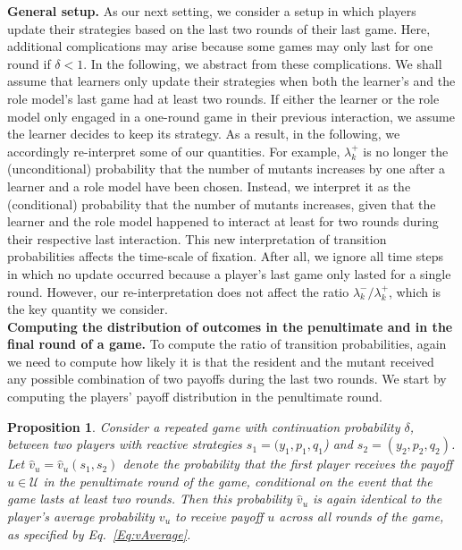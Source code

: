 \documentclass[11pt]{article}
\def\strategy{s}
\theoremstyle{plainCl1}
\newtheorem{Prop}{Proposition}
\theoremstyle{plainCl2}
\begin{document}

{\bf General setup.} As our next setting, we consider a setup in which players update their strategies based on the last two rounds of their last game. 
Here, additional complications may arise because some games may only last for one round if $\delta\!<\!1$.
In the following, we abstract from these complications.  
We shall assume that learners only update their strategies when both the learner's and the role model's last game had at least two rounds. 
If either the learner or the role model only engaged in a one-round game in their previous interaction, we assume the learner decides to keep its strategy. 
As a result, in the following, we accordingly re-interpret some of our quantities. 
For example, $\lambda^+_k$ is no longer the (unconditional) probability that the number of mutants increases by one after a learner and a role model have been chosen.
Instead, we interpret it as the (conditional) probability that the number of mutants increases, given that the learner and the role model happened to interact at least for two rounds during their respective last interaction. 
This new interpretation of transition probabilities affects the time-scale of fixation. 
After all, we ignore all time steps in which no update occurred because a player's last game only lasted for a single round.
However, our re-interpretation does not affect the ratio $\lambda^-_k/\lambda^+_k$, which is the key quantity we consider.\\ 


\noindent
{\bf Computing the distribution of outcomes in the penultimate and in the final round of a game.}
To compute the ratio of transition probabilities, again we need to compute how likely it is that the resident and the mutant received any possible combination of two payoffs during the last two rounds. 
We start by computing the players' payoff distribution in the penultimate round. 


\begin{Prop}\label{proposition:penultimate_round} 
Consider a repeated game with continuation probability $\delta$, between two players with reactive strategies $\strategy_1\!=\!(y_1, p_1, q_1$)  and $\strategy_2\!=\!(y_2,p_2,q_2)$. 
Let $\hat{v}_u\!=\!\hat{v}_u(\strategy_1,\strategy_2)$ denote the probability that the first player receives the payoff $u\!\in\!\mathcal{U}$ in the penultimate round of the game, conditional on the event that the game lasts at least two rounds. 
Then this probability  $\hat{v}_u$ is again identical to the player's average probability $v_u$ to receive payoff $u$ across all rounds of the game, as specified by Eq.~\eqref{Eq:vAverage}.
\end{Prop}
\end{document}
